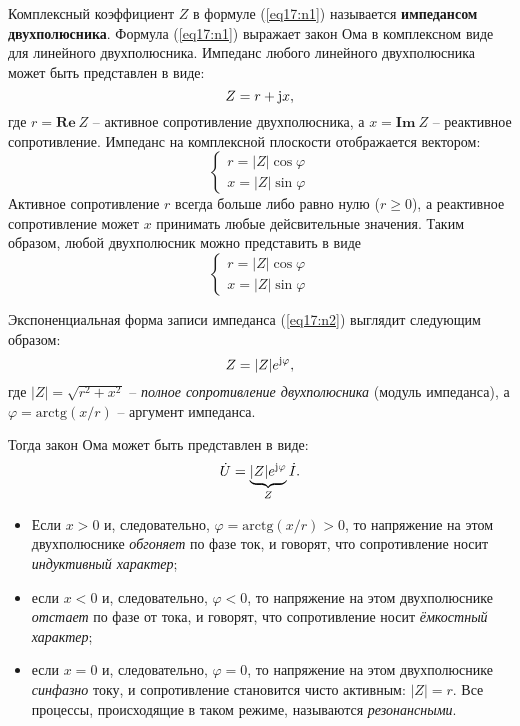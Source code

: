     Комплексный коэффициент \( Z \) в формуле (\ref{eq17:n1}) называется
    \textbf{импедансом двухполюсника}. Формула (\ref{eq17:n1}) выражает закон
    Ома в комплексном виде для линейного двухполюсника. Импеданс любого
    линейного двухполюсника может быть представлен в виде:
    \begin{equation}
        Z = r + \mathrm{j} x,
        \label{eq17:n2}
    \end{equation}
    где \( r = \mathbf{Re\ }Z \) -- активное сопротивление двухполюсника, а
    \( x = \mathbf{Im\ }Z \) -- реактивное сопротивление. Импеданс на
    комплексной плоскости отображается вектором:
    \[
        \left\{
        \begin{array}{l}
            r = |Z|\cos\varphi \\
            x = |Z|\sin\varphi
        \end{array}
        \right.
    \]
    Активное сопротивление  \( r \) всегда больше либо равно нулю
    (\( r \geq 0 \)), а реактивное сопротивление может \( x \) принимать любые
    дейсвительные значения. Таким образом, любой двухполюсник можно представить
    в виде
    \[
        \left\{
        \begin{array}{l}
            r = |Z|\cos\varphi \\
            x = |Z|\sin\varphi
        \end{array}
        \right.
    \]

    Экспоненциальная форма записи импеданса (\ref{eq17:n2}) выглядит следующим
    образом:
    \[
        Z = |Z|e^{\mathrm{j}\varphi},
    \]
    где \( |Z| = \sqrt{r^2 + x^2} \) -- \textit{полное сопротивление
    двухполюсника} (модуль импеданса), а \( \varphi = \mathrm{arctg}(x/r) \) --
    аргумент импеданса.
    
    Тогда закон Ома может быть представлен в виде:
    \begin{equation}
        \dot{U} = \underbrace{|Z|e^{\mathrm{j}\varphi}}_{Z}\dot{I}.
         \label{eq17:n2a}
    \end{equation}
    \begin{itemize}
        \item Если \( x > 0 \) и, следовательно,
            \( \varphi = \mathrm{arctg}(x/r) > 0 \), то напряжение на этом
            двухполюснике \textit{обгоняет} по фазе ток, и говорят, что
            сопротивление носит \textit{индуктивный характер};
        \item если \( x < 0 \) и, следовательно, \( \varphi < 0 \), то
            напряжение на этом двухполюснике \textit{отстает} по фазе от тока,
            и говорят, что сопротивление носит \textit{ёмкостный характер};
        \item если \( x = 0 \) и, следовательно, \( \varphi = 0 \), то
            напряжение на этом двухполюснике \textit{синфазно} току, и
            сопротивление становится чисто активным: \( |Z| = r \).
            Все процессы, происходящие в таком режиме, называются
            \textit{резонансными}.
    \end{itemize}
    
